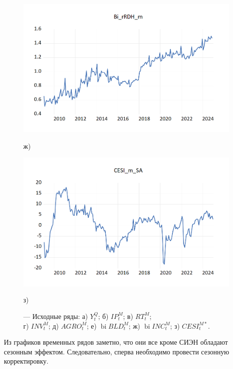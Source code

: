 \documentclass[a4paper, 14pt]{extreport}
\numberwithin{equation}{section}
\newcommand{\bi}{\operatorname{bi}}
\numberwithin{equation}{section}
\begin{document}
\begin{figure}[h!]
		\begin{minipage}{0.5\textwidth}
			\centering
			\includegraphics[scale=0.4]{images/image12}
			\caption*{ж)}
		\end{minipage}%
		\hfill %
		\begin{minipage}{0.5\textwidth}
			\centering
			\includegraphics[scale=0.4]{images/image14}
			\caption*{з)}
		\end{minipage}
		
		\caption{\centering --- Исходные ряды: а) {$Y_t^Q$}; б) {$IP_t^M$}; в) {$RT_t^M$};\\ г) {$INV_t^M$}; д) {$AGRO_t^M$}; е) {$\bi BLD_t^M$}; ж) $\bi INC_t^M$; з) $CESI^{M*}_t$.}
		\label{fig:ts-1}
	\end{figure}
	
	Из графиков временных рядов заметно, что они все кроме СИЭН обладают сезонным эффектом. Следовательно, сперва необходимо провести сезонную корректировку.
\end{document}
